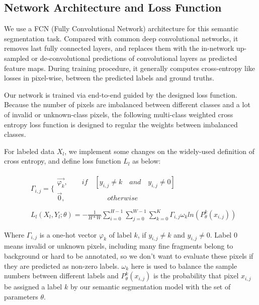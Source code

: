 \subsection{Network Architecture and Loss Function}
We use a FCN (Fully Convolutional Network) architecture for this semantic segmentation task.
Compared with common deep convolutional networks, it removes last fully connected layers, and replaces them with the in-network up-sampled or de-convolutional predictions of convolutional layers as predicted feature maps. During training procedure, it generally computes cross-entropy like losses in pixel-wise, between the predicted labels and ground truths.

Our network is trained via end-to-end guided by the designed loss function. Because the number of pixels are imbalanced between different classes and a lot of invalid or unknown-class pixels, the following multi-class weighted cross entropy loss function is designed to regular the weights between imbalanced classes.

For labeled data $X_l$, we implement some changes on the widely-used definition of cross entropy, and define loss function $L_l$ as below:

\begin{equation}
\begin{split}
&\varGamma_{i,j}=\{
	\begin{array}{lr}
	\overrightarrow{\varphi_k} ,\quad\quad if \quad [y_{i,j}\neq k \quad and\quad y_{i,j}\neq0]	\\
	\overrightarrow{0} ,\quad\quad\quad\quad\quad\quad  otherwise
	\end{array}	\\
	\\
&\textit{}L_l(X_l,Y_l;\theta)=-\frac{1}{H*W}\sum_{i=0}^{H-1}\sum_{j=0}^{W-1}\sum_{k=0}^K{\varGamma_{i,j}\omega_{k}ln(P^k_{\theta}(x_{i,j}))}
\end{split}
\end{equation}

Where $\varGamma_{i,j}$ is a one-hot vector $\varphi_k$ of label $k$, if $y_{i,j}\neq k$ and $y_{i,j}\neq0$. Label 0 means invalid or unknown pixels, including many fine fragments belong to background or hard to be annotated, so we don't want to evaluate these pixels if they are predicted as non-zero labels. $\omega_{k}$ here is used to balance the sample numbers between different labels and $P^k_{\theta}(x_{i,j})$ is the probability that pixel $x_{i,j}$ be assigned a label $k$ by our semantic segmentation model with the set of parameters $\theta$.

